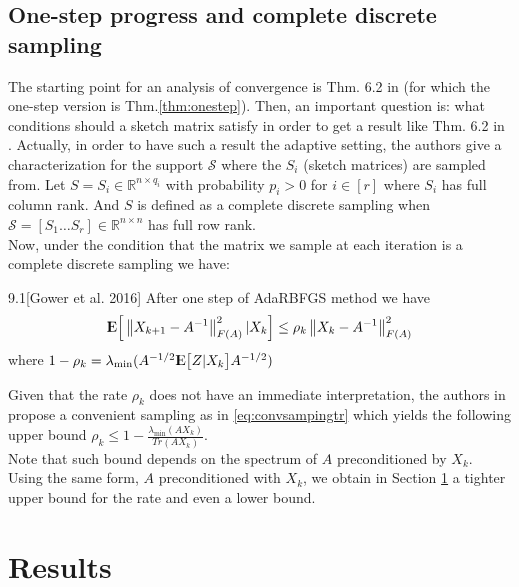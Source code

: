 \documentclass[12pt,conference,compsocconf]{IEEEtran}
\newcommand\norm[1]{\left\lVert#1\right\rVert}
\newcommand{\E}{{\rm I\kern-.3em E}}
\newcommand{\R}{\mathbb{R}}
\begin{document}
\subsection{One-step progress and complete discrete sampling}\label{sect:completediscrete}
The starting point for an analysis of convergence is Thm. 6.2 in \cite{Gower1} (for which the one-step version is Thm.\ref{thm:onestep}). Then, an important question is: what conditions should a sketch matrix satisfy in order to get a result like Thm. 6.2 in \cite{Gower1}. Actually, in order to have such a result the adaptive setting, the authors give a characterization for the support $\mathcal{S}$ where the $S_i$ (sketch matrices) are sampled from. Let $S=S_i\in \R^{n\times q_i}$ with probability $p_i>0$ for $i \in [r]$ where $S_i$ has full column rank. And $S$ is defined as a complete discrete sampling when $\mathcal{S}=[S_1\ldots S_r]\in \R^{n\times n}$ has full row rank.\\
Now, under the condition that the matrix we sample at each iteration is a complete discrete sampling we have:
\begin{customthm}{9.1}[Gower et al. 2016]\label{thm:onestep}
After one step of AdaRBFGS method we have\\

\begin{align}\label{eq:onestepprogress}
	\E\Big[\norm{X_{k+1}-A^{-1}}^2_{F(A)}|X_k\Big] \leq \rho _k\norm{X_k-A^{-1}}^2_{F(A)}
\end{align}
where $1-\rho_k=\lambda_{\text{min}}(A^{-1/2}\E\big[Z|X_k\big]A^{-1/2})$
\end{customthm}

Given that the rate $\rho_k$ does not have an immediate interpretation, the authors in \cite{Gower1} propose a convenient sampling as in \eqref{eq:convsampingtr} which yields the following upper bound $\rho_k \leq 1-\frac{\lambda_{\text{min}}(AX_k)}{Tr(AX_k)}$.\\
Note that such bound depends on the spectrum of $A$ preconditioned by $X_k$. Using the same form, $A$ preconditioned with $X_k$, we obtain in Section \ref{sect:results} a tighter upper bound for the rate and even a lower bound.


\section{Results}\label{sect:results}
\end{document}
